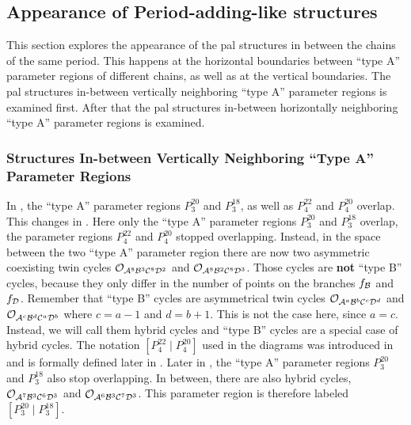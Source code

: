 \subsection{Appearance of Period-adding-like structures}
\label{sec:add.change.appa}

This section explores the appearance of the \gls{pal} structures in between the chains of the same period.
This happens at the horizontal boundaries between ``type A'' parameter regions of different chains, as well as at the vertical boundaries.
The \gls{pal} structures in-between vertically neighboring ``type A'' parameter regions is examined first.
After that the \gls{pal} structures in-between horizontally neighboring ``type A'' parameter regions is examined.

\subsubsection{ Structures In-between Vertically Neighboring ``Type A'' Parameter Regions}
\label{sec:add.change.appa.hor}

In , the ``type A'' parameter regions $P^{20}_3$ and $P^{18}_3$, as well as $P^{22}_4$ and $P^{20}_4$ overlap.
This changes in .
Here only the ``type A'' parameter regions $P^{20}_3$ and $P^{18}_3$ overlap, the parameter regions $P^{22}_4$ and $P^{20}_4$ stopped overlapping.
Instead, in the space between the two ``type A'' parameter region there are now two asymmetric coexisting twin cycles $\mathcal{O}_{\mathcal{A}^8\mathcal{B}^3\mathcal{C}^8\mathcal{D}^2}$ and $\mathcal{O}_{\mathcal{A}^8\mathcal{B}^2\mathcal{C}^8\mathcal{D}^3}$.
Those cycles are \textbf{not} ``type B'' cycles, because they only differ in the number of points on the branches $f_{\mathcal{B}}$ and $f_{\mathcal{D}}$.
Remember that ``type B'' cycles are asymmetrical twin cycles $\mathcal{O}_{\mathcal{A}^a\mathcal{B}^b\mathcal{C}^c\mathcal{D}^d}$ and $\mathcal{O}_{\mathcal{A}^c\mathcal{B}^d\mathcal{C}^a\mathcal{D}^b}$ where $c = a - 1$ and $d = b + 1$.
This is not the case here, since $a = c$.
Instead, we will call them hybrid cycles and ``type B'' cycles are a special case of hybrid cycles.
The notation $\left[P^{22}_4 \mid P^{20}_4\right]$ used in the diagrams was introduced in  and is formally defined later in .
Later in , the ``type A'' parameter regions $P^{20}_3$ and $P^{18}_3$ also stop overlapping.
In between, there are also hybrid cycles, $\mathcal{O}_{\mathcal{A}^7\mathcal{B}^3\mathcal{C}^6\mathcal{D}^3}$ and $\mathcal{O}_{\mathcal{A}^6\mathcal{B}^3\mathcal{C}^7\mathcal{D}^3}$.
This parameter region is therefore labeled $\left[P^{20}_3 \mid P^{18}_3\right]$.

